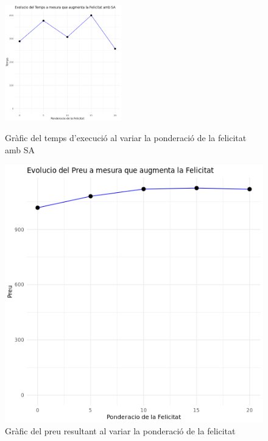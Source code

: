 \documentclass[a4paper]{article}
\begin{document}
\begin{table}[ht]
	\begin{figure}[H]
		\centering
		\includegraphics[width=0.45\textwidth]{images/exp7b_grafic.png}
		\caption{Gràfic del temps d'execució al variar la ponderació de la felicitat amb SA}
		\label{fig:exp7b_grafic}
		\begin{minipage}{0.45\textwidth}
			\centering
			\includegraphics[width=\textwidth]{images/exp7_grafic.png}
			\caption{Gràfic del preu resultant al variar la ponderació de la felicitat}
			\label{fig:exp7_grafic}
		\end{minipage} \hfill
		\begin{minipage}{0.45\textwidth}
			\centering

\end{minipage}
\end{figure}
\end{table}
\end{document}
